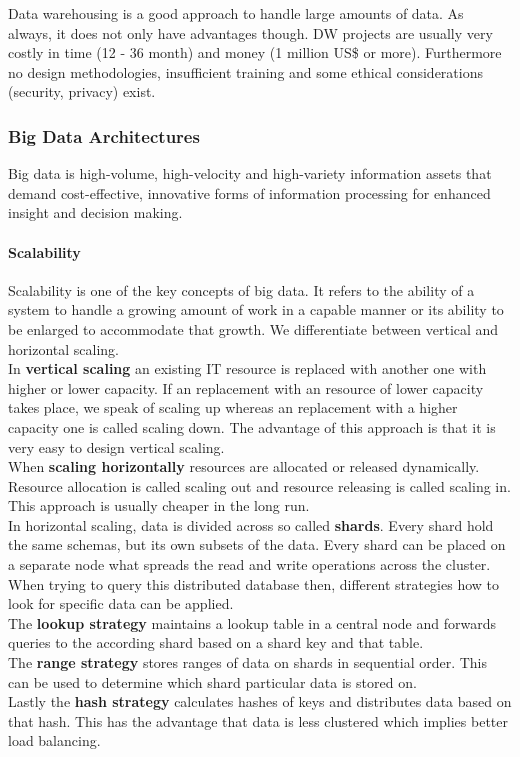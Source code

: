 Data warehousing is a good approach to handle large amounts of data.
As always, it does not only have advantages though.
DW projects are usually very costly in time (12 - 36 month) and money (1 million US\$ or more).
Furthermore no design methodologies, insufficient training and some ethical considerations (security, privacy) exist.

\subsubsection{Big Data Architectures}
Big data is high-volume, high-velocity and high-variety information assets that demand cost-effective, innovative forms of information processing for enhanced insight and decision making.

\paragraph{Scalability}
Scalability is one of the key concepts of big data.
It refers to the ability of a system to handle a growing amount of work in a capable manner or its ability to be enlarged to accommodate that growth. We differentiate between vertical and horizontal scaling.\\
In \textbf{vertical scaling} an existing IT resource is replaced with another one with higher or lower capacity.
If an replacement with an resource of lower capacity takes place, we speak of scaling up whereas an replacement with a higher capacity one is called scaling down.
The advantage of this approach is that it is very easy to design vertical scaling.\\
When \textbf{scaling horizontally} resources are allocated or released dynamically.
Resource allocation is called scaling out and resource releasing is called scaling in.
This approach is usually cheaper in the long run.\\

In horizontal scaling, data is divided across so called \textbf{shards}.
Every shard hold the same schemas, but its own subsets of the data.
Every shard can be placed on a separate node what spreads the read and write operations across the cluster.
When trying to query this distributed database then, different strategies how to look for specific data can be applied.\\
The \textbf{lookup strategy} maintains a lookup table in a central node and forwards queries to the according shard based on a shard key and that table.\\
The \textbf{range strategy} stores ranges of data on shards in sequential order. This can be used to determine which shard particular data is stored on.\\
Lastly the \textbf{hash strategy} calculates hashes of keys and distributes data based on that hash.
This has the advantage that data is less clustered which implies better load balancing.\\

